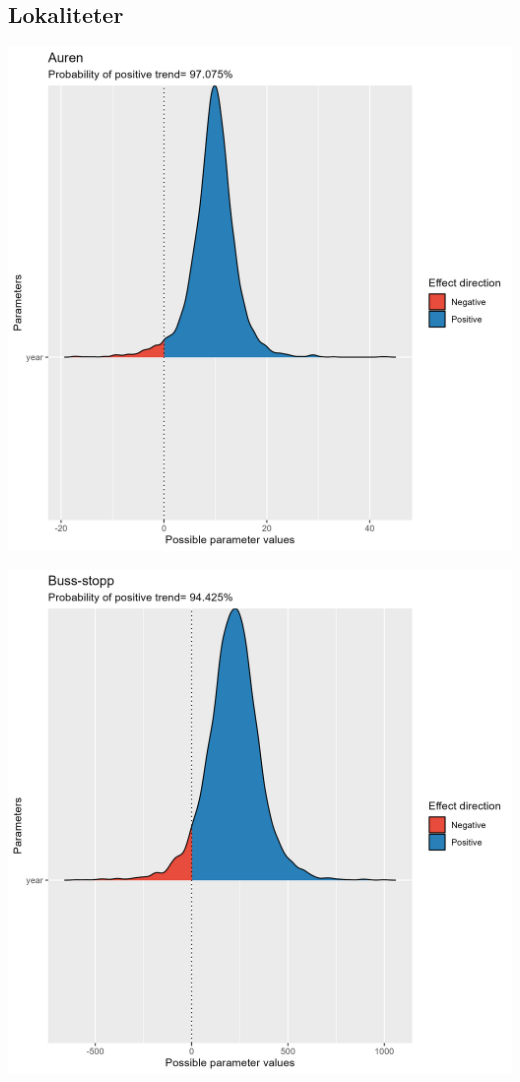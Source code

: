 \documentclass[
  letterpaper,
  DIV=11,
  numbers=noendperiod]{scrreport}
\begin{document}
\hypertarget{lokaliteter-2}{%
\subsection{Lokaliteter}\label{lokaliteter-2}}

\includegraphics{data/derived_data/direction_plots/plots/Auren.png}

\includegraphics{data/derived_data/direction_plots/plots/Buss-stopp.png}
\end{document}
